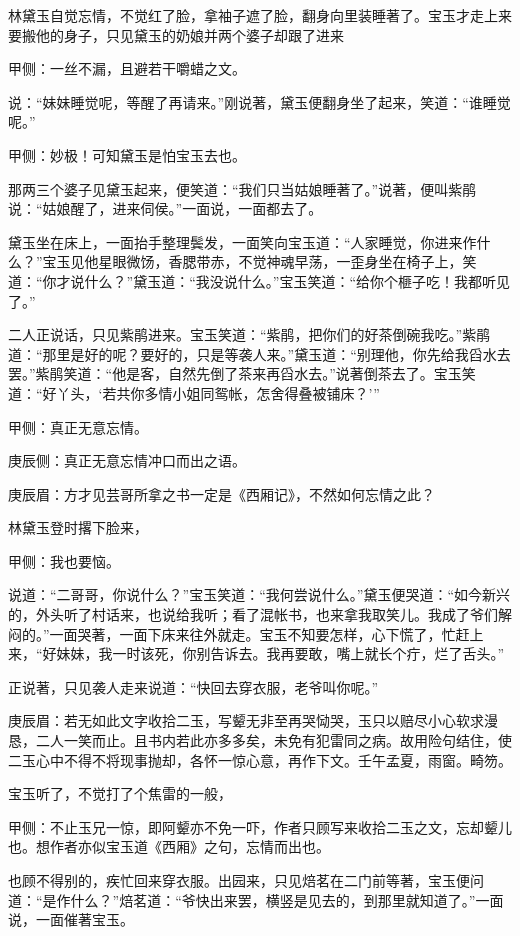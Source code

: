 \begin{parag}
    林黛玉自觉忘情，不觉红了脸，拿袖子遮了脸，翻身向里装睡著了。宝玉才走上来要搬他的身子，只见黛玉的奶娘并两个婆子却跟了进来\begin{note}甲侧：一丝不漏，且避若干嚼蜡之文。\end{note}说：“妹妹睡觉呢，等醒了再请来。”刚说著，黛玉便翻身坐了起来，笑道：“谁睡觉呢。”\begin{note}甲侧：妙极！可知黛玉是怕宝玉去也。\end{note}那两三个婆子见黛玉起来，便笑道：“我们只当姑娘睡著了。”说著，便叫紫鹃说：“姑娘醒了，进来伺侯。”一面说，一面都去了。
\end{parag}


\begin{parag}
    黛玉坐在床上，一面抬手整理鬓发，一面笑向宝玉道：“人家睡觉，你进来作什么？”宝玉见他星眼微饧，香腮带赤，不觉神魂早荡，一歪身坐在椅子上，笑道：“你才说什么？”黛玉道：“我没说什么。”宝玉笑道：“给你个榧子吃！我都听见了。”
\end{parag}


\begin{parag}
    二人正说话，只见紫鹃进来。宝玉笑道：“紫鹃，把你们的好茶倒碗我吃。”紫鹃道：“那里是好的呢？要好的，只是等袭人来。”黛玉道：“别理他，你先给我舀水去罢。”紫鹃笑道：“他是客，自然先倒了茶来再舀水去。”说著倒茶去了。宝玉笑道：“好丫头，‘若共你多情小姐同鸳帐，怎舍得叠被铺床？’”\begin{note}甲侧：真正无意忘情。\end{note}\begin{note}庚辰侧：真正无意忘情冲口而出之语。\end{note}\begin{note}庚辰眉：方才见芸哥所拿之书一定是《西厢记》，不然如何忘情之此？\end{note}林黛玉登时撂下脸来，\begin{note}甲侧：我也要恼。\end{note}说道：“二哥哥，你说什么？”宝玉笑道：“我何尝说什么。”黛玉便哭道：“如今新兴的，外头听了村话来，也说给我听；看了混帐书，也来拿我取笑儿。我成了爷们解闷的。”一面哭著，一面下床来往外就走。宝玉不知要怎样，心下慌了，忙赶上来，“好妹妹，我一时该死，你别告诉去。我再要敢，嘴上就长个疔，烂了舌头。”
\end{parag}


\begin{parag}
    正说著，只见袭人走来说道：“快回去穿衣服，老爷叫你呢。”\begin{note}庚辰眉：若无如此文字收拾二玉，写颦无非至再哭恸哭，玉只以赔尽小心软求漫恳，二人一笑而止。且书内若此亦多多矣，未免有犯雷同之病。故用险句结住，使二玉心中不得不将现事抛却，各怀一惊心意，再作下文。壬午孟夏，雨窗。畸笏。\end{note}宝玉听了，不觉打了个焦雷的一般，\begin{note}甲侧：不止玉兄一惊，即阿颦亦不免一吓，作者只顾写来收拾二玉之文，忘却颦儿也。想作者亦似宝玉道《西厢》之句，忘情而出也。\end{note}也顾不得别的，疾忙回来穿衣服。出园来，只见焙茗在二门前等著，宝玉便问道：“是作什么？”焙茗道：“爷快出来罢，横竖是见去的，到那里就知道了。”一面说，一面催著宝玉。
\end{parag}


